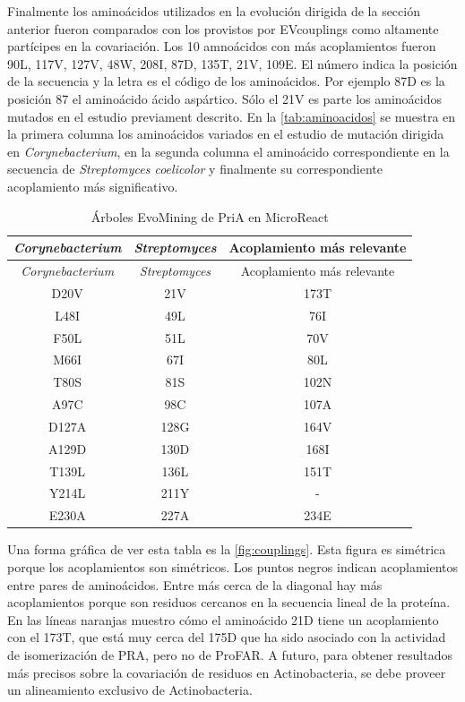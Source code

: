\documentclass[12pt,twoside]{reedthesis}
\begin{document}
  Finalmente los aminoácidos utilizados en la evolución dirigida de la
  sección anterior fueron comparados con los provistos por EVcouplings
  como altamente partícipes en la covariación. Los 10 amnoácidos con más
  acoplamientos fueron 90L, 117V, 127V, 48W, 208I, 87D, 135T, 21V, 109E.
  El número indica la posición de la secuencia y la letra es el código de
  los aminoácidos. Por ejemplo 87D es la posición 87 el aminoácido ácido
  aspártico. Sólo el 21V es parte los aminoácidos mutados en el estudio
  previament descrito. En la \autoref{tab:aminoacidos} se muestra en la
  primera columna los aminoácidos variados en el estudio de mutación
  dirigida en \emph{Corynebacterium}, en la segunda columna el aminoácido
  correspondiente en la secuencia de \emph{Streptomyces coelicolor} y
  finalmente su correspondiente acoplamiento más significativo.\\
  
  \begin{longtable}[]{@{}ccc@{}}
  \caption{Árboles EvoMining de PriA en MicroReact
  \label{tab:aminoacidos}}\tabularnewline
  \toprule
  \emph{Corynebacterium} & \emph{Streptomyces} & Acoplamiento más
  relevante\tabularnewline
  \midrule
  \endfirsthead
  \toprule
  \emph{Corynebacterium} & \emph{Streptomyces} & Acoplamiento más
  relevante\tabularnewline
  \midrule
  \endhead
  D20V & 21V & 173T\tabularnewline
  L48I & 49L & 76I\tabularnewline
  F50L & 51L & 70V\tabularnewline
  M66I & 67I & 80L\tabularnewline
  T80S & 81S & 102N\tabularnewline
  A97C & 98C & 107A\tabularnewline
  D127A & 128G & 164V\tabularnewline
  A129D & 130D & 168I\tabularnewline
  T139L & 136L & 151T\tabularnewline
  Y214L & 211Y & -\tabularnewline
  E230A & 227A & 234E\tabularnewline
  \bottomrule
  \end{longtable}
  
  Una forma gráfica de ver esta tabla es la \autoref{fig:couplings}. Esta
  figura es simétrica porque los acoplamientos son simétricos. Los puntos
  negros indican acoplamientos entre pares de aminoácidos. Entre más cerca
  de la diagonal hay más acoplamientos porque son residuos cercanos en la
  secuencia lineal de la proteína. En las líneas naranjas muestro cómo el
  aminoácido 21D tiene un acoplamiento con el 173T, que está muy cerca del
  175D que ha sido asociado con la actividad de isomerización de PRA, pero
  no de ProFAR. A futuro, para obtener resultados más precisos sobre la
  covariación de residuos en Actinobacteria, se debe proveer un
  alineamiento exclusivo de Actinobacteria.
  
\end{document}

